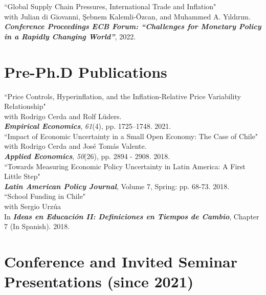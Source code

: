 \documentclass[11pt]{article}
\begin{document}
``Global Supply Chain Pressures, International Trade and Inflation"\\
with Julian di Giovanni, \c{S}ebnem Kalemli-\"{O}zcan, and Muhammed A. Y{\i}ld{\i}r{\i}m. \\
\textbf{\textit{Conference Proceedings ECB Forum: ``Challenges for Monetary Policy in a Rapidly Changing World''}}, 2022.\\[-0.1in]

\section*{Pre-Ph.D Publications}
``Price Controls, Hyperinflation, and the Inflation-Relative Price Variability Relationship"\\
 with Rodrigo Cerda and Rolf L\"{u}ders. \\
 \textbf{\textit{Empirical Economics}}, \emph{61}(4), pp. 1725--1748. 2021.\\[-0.1in]

``Impact of Economic Uncertainty in a Small Open Economy: The Case of Chile"\\
 with Rodrigo Cerda and Jos\'e Tom\'as Valente. \\
 \textbf{\textit{Applied Economics}}, \textit{50}(26), pp. 2894 - 2908. 2018.\\[-0.1in]



``Towards Measuring Economic Policy Uncertainty in Latin America: A First Little Step" \\
\textbf{\textit{Latin American Policy Journal}}, Volume 7, Spring: pp. 68-73. 2018.\\[-0.1in]

``School Funding in Chile"\\
 with Sergio Urz\'ua \\
In  \textbf{\textit{Ideas en Educaci\'on II: Definiciones en Tiempos de Cambio}}, Chapter 7 (In Spanish). 2018.

\section*{Conference and Invited Seminar Presentations (since 2021)}
\end{document}
